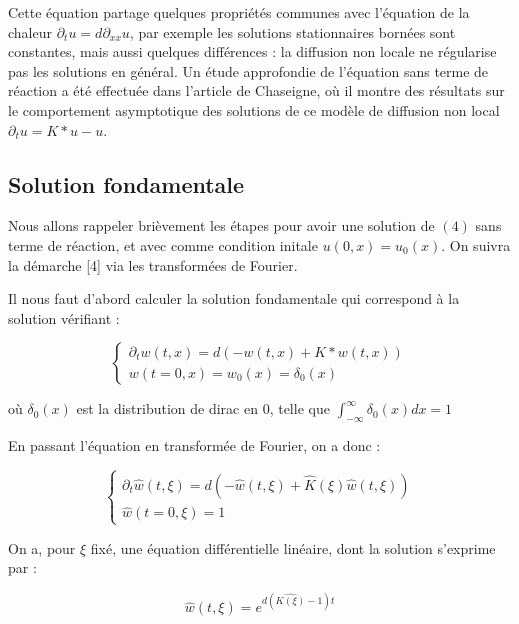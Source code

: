 \documentclass{article}
\begin{document}
Cette équation partage quelques propriétés communes avec l'équation de la chaleur $\partial_t u = d\partial_{xx}u$, par exemple les solutions stationnaires bornées sont constantes, mais aussi quelques différences : la diffusion non locale ne régularise pas les solutions en général. Un étude approfondie de l'équation sans terme de réaction a été effectuée dans l'article de Chaseigne, où il montre des résultats sur le comportement asymptotique des solutions de ce modèle de diffusion non local $\partial_t u = K*u - u$.


\subsection{Solution fondamentale}
\indent Nous allons rappeler brièvement les étapes pour avoir une solution de $(4)$ sans terme de réaction, et avec comme condition initale $u(0,x)=u_0(x)$. On suivra la démarche [4] via les transformées de Fourier. \newline

\noindent Il nous faut d'abord calculer la solution fondamentale qui correspond à la solution vérifiant :

\begin{equation*}
\left\{
  \begin{array}{cc}
\partial_t w(t,x) =  d(-w(t,x) + K*w(t,x)) \\
w(t=0,x) = w_0(x) = \delta_0(x)
\end{array}
\right.
\end{equation*}

\noindent où $\delta_0(x)$ est la distribution de dirac en 0, telle que $\int_{-\infty}^{\infty} \delta_0(x)dx = 1$

En passant l'équation en transformée de Fourier, on a donc :

\begin{equation*}
\left\{
  \begin{array}{cc}
\partial_t \widehat{w}(t,\xi) = d(-\widehat{w}(t,\xi) + \widehat{K}(\xi) \widehat{w}(t,\xi))\\
\widehat{w}(t=0,\xi) = 1
\end{array}
\right.
\end{equation*}

On a, pour $\xi$ fixé, une équation différentielle linéaire, dont la solution s'exprime par :

\begin{equation*}
\widehat{w}(t,\xi) = e^{d(\widehat{K(\xi)} -1)t}
\end{equation*}
\end{document}
